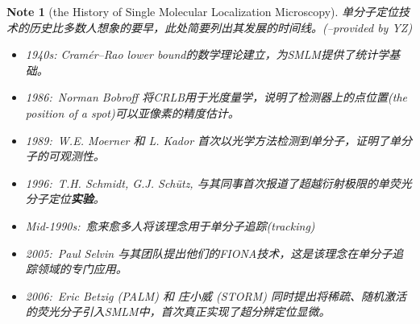 \documentclass[12pt]{ctexart}
\newtheorem{note}{Note}
\begin{document}
\begin{note}[the History of Single Molecular Localization Microscopy]
    单分子定位技术的历史比多数人想象的要早，此处简要列出其发展的时间线。(--provided by YZ)
    \begin{itemize} 
        \item 1940s: Cramér–Rao lower bound的数学理论建立，为SMLM提供了统计学基础。
        \item 1986: Norman Bobroff 将CRLB用于光度量学，说明了检测器上的点位置(the position of a spot)可以亚像素的精度估计。
        \item 1989: W.E. Moerner 和 L. Kador 首次以光学方法检测到单分子，证明了单分子的可观测性。
        \item 1996: T.H. Schmidt, G.J. Schütz, 与其同事首次报道了超越衍射极限的单荧光分子定位\textbf{实验}。
        \item Mid-1990s: 愈来愈多人将该理念用于单分子追踪(tracking)
        \item 2005: Paul Selvin 与其团队提出他们的FIONA技术，这是该理念在单分子追踪领域的专门应用。
        \item 2006: Eric Betzig (PALM)\cite{betzigImagingIntracellularFluorescent2006} 和 庄小威 (STORM)\cite{rustSubdiffractionlimitImagingStochastic2006} 同时提出将稀疏、随机激活的荧光分子引入SMLM中，首次真正实现了超分辨定位显微。
    \end{itemize}
\end{note}



\end{document}
